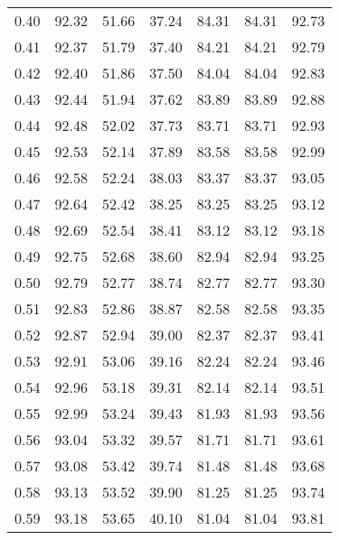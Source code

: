 \begin{tabular}{|c|c|c|c|c|c|c|}
      0.40 &     92.32 &     51.66 &      37.24 &   84.31 &      84.31 &         92.73 \\
      0.41 &     92.37 &     51.79 &      37.40 &   84.21 &      84.21 &         92.79 \\
      0.42 &     92.40 &     51.86 &      37.50 &   84.04 &      84.04 &         92.83 \\
      0.43 &     92.44 &     51.94 &      37.62 &   83.89 &      83.89 &         92.88 \\
      0.44 &     92.48 &     52.02 &      37.73 &   83.71 &      83.71 &         92.93 \\
      0.45 &     92.53 &     52.14 &      37.89 &   83.58 &      83.58 &         92.99 \\
      0.46 &     92.58 &     52.24 &      38.03 &   83.37 &      83.37 &         93.05 \\
      0.47 &     92.64 &     52.42 &      38.25 &   83.25 &      83.25 &         93.12 \\
      0.48 &     92.69 &     52.54 &      38.41 &   83.12 &      83.12 &         93.18 \\
      0.49 &     92.75 &     52.68 &      38.60 &   82.94 &      82.94 &         93.25 \\
      0.50 &     92.79 &     52.77 &      38.74 &   82.77 &      82.77 &         93.30 \\
      0.51 &     92.83 &     52.86 &      38.87 &   82.58 &      82.58 &         93.35 \\
      0.52 &     92.87 &     52.94 &      39.00 &   82.37 &      82.37 &         93.41 \\
      0.53 &     92.91 &     53.06 &      39.16 &   82.24 &      82.24 &         93.46 \\
      0.54 &     92.96 &     53.18 &      39.31 &   82.14 &      82.14 &         93.51 \\
      0.55 &     92.99 &     53.24 &      39.43 &   81.93 &      81.93 &         93.56 \\
      0.56 &     93.04 &     53.32 &      39.57 &   81.71 &      81.71 &         93.61 \\
      0.57 &     93.08 &     53.42 &      39.74 &   81.48 &      81.48 &         93.68 \\
      0.58 &     93.13 &     53.52 &      39.90 &   81.25 &      81.25 &         93.74 \\
      0.59 &     93.18 &     53.65 &      40.10 &   81.04 &      81.04 &         93.81 \\

\end{tabular}
